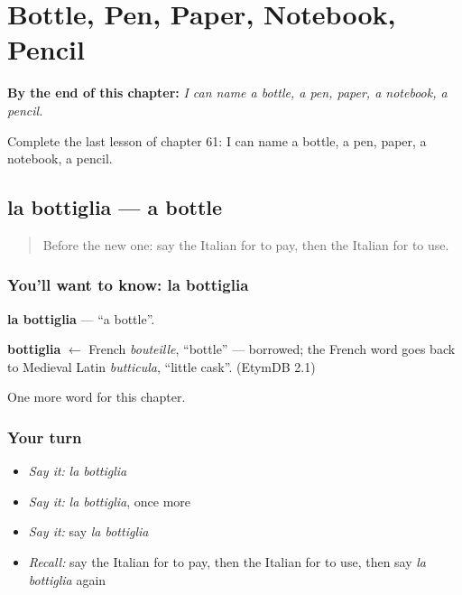 
\chapter{Bottle, Pen, Paper, Notebook, Pencil}
\label{ch:it-bottle-pen-paper-notebook-pencil}

\begin{chapteropening}
\textbf{By the end of this chapter:} \emph{I can name a bottle, a pen, paper, a notebook, a pencil.}

Complete the last lesson of chapter 61: I can name a bottle, a pen, paper, a notebook, a pencil.
\end{chapteropening}

\section[la bottiglia]{la bottiglia — a bottle}

\label{lesson:IT-C61-bottiglia}



\begin{quote}
Before the new one: say the Italian for to pay, then the Italian for to use.
\end{quote}

\subsection*{You'll want to know: la bottiglia}
\textbf{la bottiglia} — \textquotedblleft{}a bottle\textquotedblright{}.

\begin{cousinweb}
\textbf{bottiglia} $\leftarrow$ French \emph{bouteille}, \textquotedblleft{}bottle\textquotedblright{} — borrowed; the French word goes back to Medieval Latin \emph{butticula}, \textquotedblleft{}little cask\textquotedblright{}. (EtymDB 2.1)
\end{cousinweb}

\begin{grammarlens}[title={What you've built}]
One more word for this chapter.
\end{grammarlens}

\subsection*{Your turn}
\begin{itemize}
\raggedright
  \item \emph{Say it:} \emph{la bottiglia}
  \item \emph{Say it:} \emph{la bottiglia}, once more
  \item \emph{Say it:} say \emph{la bottiglia}
  \item \emph{Recall:} say the Italian for to pay, then the Italian for to use, then say \emph{la bottiglia} again
\end{itemize}

